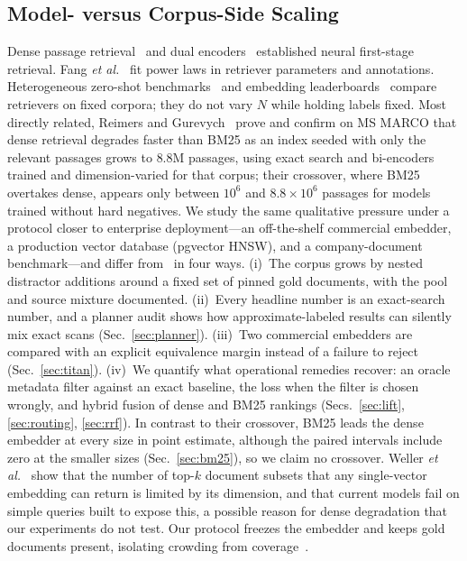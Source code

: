 \documentclass{ieeeaccess}
\makeatletter
\DeclareRobustCommand{\_}{\ifmmode\nfss@text{\textunderscore}\else\textunderscore\allowbreak\fi}
\makeatother
\begin{document}
\subsection{Model- versus Corpus-Side Scaling}
Dense passage retrieval~\cite{karpukhin2020dpr} and dual encoders~\cite{ni2021large} established neural first-stage retrieval. Fang \emph{et al.}~\cite{fang2024drscale} fit power laws in retriever parameters and annotations. Heterogeneous zero-shot benchmarks~\cite{thakur2021beir} and embedding leaderboards~\cite{muennighoff2023mteb} compare retrievers on fixed corpora; they do not vary $N$ while holding labels fixed. Most directly related, Reimers and Gurevych~\cite{reimers2021curse} prove and confirm on MS MARCO that dense retrieval degrades faster than BM25 as an index seeded with only the relevant passages grows to $8.8$M passages, using exact search and bi-encoders trained and dimension-varied for that corpus; their crossover, where BM25 overtakes dense, appears only between $10^6$ and $8.8{\times}10^6$ passages for models trained without hard negatives. We study the same qualitative pressure under a protocol closer to enterprise deployment---an off-the-shelf commercial embedder, a production vector database (pgvector HNSW), and a company-document benchmark---and differ from~\cite{reimers2021curse} in four ways. (i)~The corpus grows by nested distractor additions around a fixed set of pinned gold documents, with the pool and source mixture documented. (ii)~Every headline number is an exact-search number, and a planner audit shows how approximate-labeled results can silently mix exact scans (Sec.~\ref{sec:planner}). (iii)~Two commercial embedders are compared with an explicit equivalence margin instead of a failure to reject (Sec.~\ref{sec:titan}). (iv)~We quantify what operational remedies recover: an oracle metadata filter against an exact baseline, the loss when the filter is chosen wrongly, and hybrid fusion of dense and BM25 rankings (Secs.~\ref{sec:lift}, \ref{sec:routing}, \ref{sec:rrf}). In contrast to their crossover, BM25 leads the dense embedder at every size in point estimate, although the paired intervals include zero at the smaller sizes (Sec.~\ref{sec:bm25}), so we claim no crossover. Weller \emph{et al.}~\cite{weller2025limits} show that the number of top-$k$ document subsets that any single-vector embedding can return is limited by its dimension, and that current models fail on simple queries built to expose this, a possible reason for dense degradation that our experiments do not test. Our protocol freezes the embedder and keeps gold documents present, isolating crowding from coverage~\cite{lessllm2025docs}.
\end{document}
